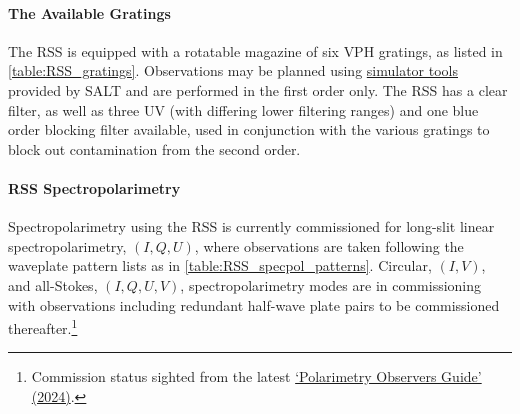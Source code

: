 \paragraph{The Available Gratings}
The \gls{RSS} is equipped with a rotatable magazine of six \gls{VPH} gratings, as listed in \autoref{table:RSS_gratings}. Observations may be planned using \href{https://astronomers.salt.ac.za/software/}{simulator tools} provided by \gls{SALT} and are performed in the first order only. The \gls{RSS} has a clear filter, as well as three \gls{UV} (with differing lower filtering ranges) and one blue order blocking filter available, used in conjunction with the various gratings to block out contamination from the second order.



\paragraph{\gls{RSS} Spectropolarimetry} \label{sec:RSS_reductions}

Spectropolarimetry using the \gls{RSS} is currently commissioned for long-slit linear spectro\-polarimetry, $(I, Q, U)$, where observations are taken following the waveplate pattern lists as in \autoref{table:RSS_specpol_patterns}. Circular, $(I, V)$, and all-Stokes, $(I, Q, U, V)$, spectropolarimetry modes are in commissioning with observations including redundant half-wave plate pairs to be commissioned thereafter.\footnote{Commission status sighted from the latest \href{https://pysalt.salt.ac.za/proposal_calls/current/ProposalCall.html}{`Polarimetry Observers Guide' (2024)}.}


